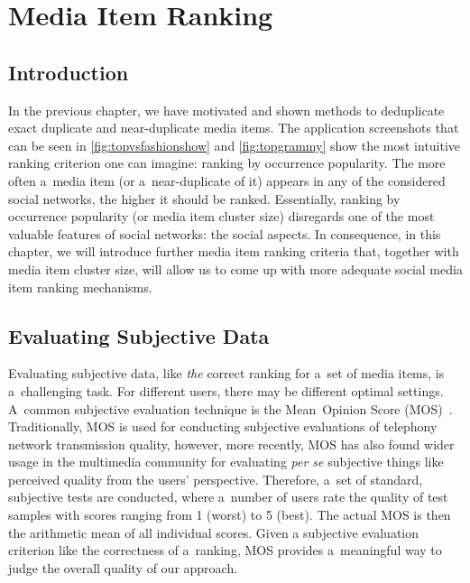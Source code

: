 \chapter{Media Item Ranking}
\label{sec:media-item-ranking}

\ifpdf
    \graphicspath{{7_media_item_ranking/figures/PNG/}{7_media_item_ranking/figures/PDF/}{7_media_item_ranking/figures/}}
\else
    \graphicspath{{7_media_item_ranking/figures/EPS/}{7_media_item_ranking/figures/}}
\fi

\section{Introduction}

In the previous chapter, we have motivated and shown methods
to deduplicate exact duplicate and near-duplicate media items.
The application screenshots that can be seen in \autoref{fig:topvsfashionshow}
and \autoref{fig:topgrammy} show the most intuitive ranking criterion
one can imagine: ranking by occurrence popularity.
The more often a~media item (or a~near-duplicate of it)
appears in any of the considered social networks, 
the higher it should be ranked.
Essentially, ranking by occurrence popularity (or media item cluster size)
disregards one of the most valuable features of social networks: 
the social aspects.
In consequence, in this chapter, we will introduce
further media item ranking criteria that,
together with media item cluster size,
will allow us to come up with more adequate social media item ranking mechanisms.

\section{Evaluating Subjective Data}

Evaluating subjective data, like \emph{the} correct ranking
for a~set of media items, is a~challenging task.
For different users, there may be different optimal settings.
A~common subjective evaluation technique
is the Mean~Opinion Score (MOS)~\cite{itu1998mos}.
Traditionally, MOS is used for conducting subjective evaluations
of telephony network transmission quality,
however, more recently, MOS has also found
wider usage in the multimedia community
for evaluating \emph{per se} subjective things
like perceived quality from the users' perspective. 
Therefore, a~set of standard, subjective tests are conducted,
where a~number of users rate the quality of test samples
with scores ranging from 1 (worst) to 5 (best).
The actual MOS is then the arithmetic mean of all individual scores.
Given a subjective evaluation criterion
like the correctness of a~ranking,
MOS provides a~meaningful way to judge the overall quality of our approach.

